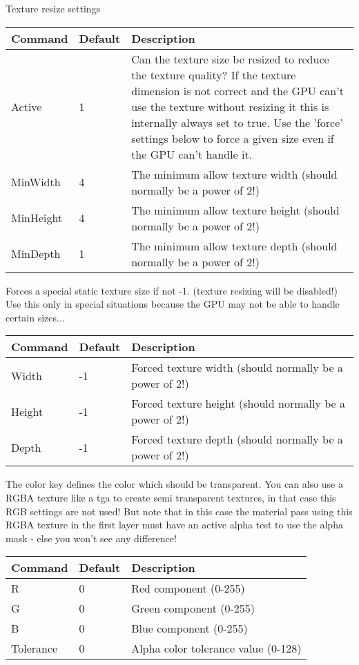 Texture resize settings\\

\begin{tabular}{|p{2.5cm}|p{2.5cm}|p{9cm}|}
\hline
\textbf{Command} & \textbf{Default} & \textbf{Description}\\
\hline
Active	  & 1 & Can the texture size be resized to reduce the texture quality? If the texture dimension
                is not correct and the GPU can't use the texture without resizing it this is internally
                always set to true. Use the 'force' settings below to force a given size even if the GPU
                can't handle it.\\
\hline
MinWidth  & 4 & The minimum allow texture width (should normally be a power of 2!)\\
\hline
MinHeight & 4 & The minimum allow texture height (should normally be a power of 2!)\\
\hline
MinDepth  & 1 & The minimum allow texture depth (should normally be a power of 2!)\\
\hline
\end{tabular}


Forces a special static texture size if not -1. (texture resizing will be disabled!)\\
Use this only in special situations because the GPU may not be able to handle certain
sizes...

\begin{tabular}{|p{2.5cm}|p{2.5cm}|p{9cm}|}
\hline
\textbf{Command} & \textbf{Default} & \textbf{Description}\\
\hline
Width  & -1 & Forced texture width (should normally be a power of 2!)\\
\hline
Height & -1 & Forced texture height (should normally be a power of 2!)\\
\hline
Depth  & -1 & Forced texture depth (should normally be a power of 2!)\\
\hline
\end{tabular}


The color key defines the color which should be transparent.
You can also use a RGBA texture like a tga to create semi transparent textures, in that
case this RGB settings are not used! But note that in this case the material pass using this
RGBA texture in the first layer must have an active alpha test to use the alpha mask - else
you won't see any difference!\\

\begin{tabular}{|p{2.5cm}|p{2.5cm}|p{9cm}|}
\hline
\textbf{Command} & \textbf{Default} & \textbf{Description}\\
\hline
R		  & 0 & Red component (0-255)\\
\hline
G		  & 0 & Green component (0-255)\\
\hline
B		  & 0 & Blue component (0-255)\\
\hline
Tolerance & 0 & Alpha color tolerance value (0-128)\\
\hline
\end{tabular}



